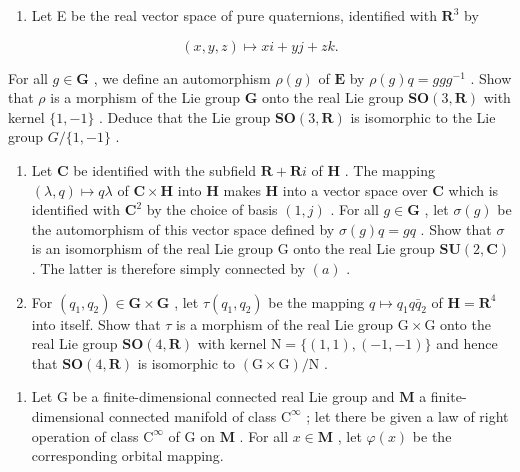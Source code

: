 \begin{enumerate}
\def\labelenumi{(\alph{enumi})}
\setcounter{enumi}{1}
\tightlist
\item
  Let E be the real vector space of pure quaternions, identified with \(\mathbf{R}^3\) by
\end{enumerate}

\[
(x, y, z) \mapsto x i + y j + z k.
\]

For all \(g \in \mathbf{G}\) , we define an automorphism \(\rho(g)\) of \(\mathbf{E}\) by \(\rho(g)q = ggg^{-1}\) . Show that \(\rho\) is a morphism of the Lie group \(\mathbf{G}\) onto the real Lie group \(\mathbf{SO}(3, \mathbf{R})\) with kernel \(\{1, -1\}\) . Deduce that the Lie group \(\mathbf{SO}(3, \mathbf{R})\) is isomorphic to the Lie group \(G / \{1, -1\}\) .

\begin{enumerate}
\def\labelenumi{(\alph{enumi})}
\setcounter{enumi}{2}
\item
  Let \(\mathbf{C}\) be identified with the subfield \(\mathbf{R} + \mathbf{R}i\) of \(\mathbf{H}\) . The mapping \((\lambda, q) \mapsto q\lambda\) of \(\mathbf{C} \times \mathbf{H}\) into \(\mathbf{H}\) makes \(\mathbf{H}\) into a vector space over \(\mathbf{C}\) which is identified with \(\mathbf{C}^2\) by the choice of basis \((1, j)\) . For all \(g \in \mathbf{G}\) , let \(\sigma(g)\) be the automorphism of this vector space defined by \(\sigma(g)q = gq\) . Show that \(\sigma\) is an isomorphism of the real Lie group G onto the real Lie group \(\mathbf{SU}(2, \mathbf{C})\) . The latter is therefore simply connected by \((a)\) .
\item
  For \((q_{1}, q_{2}) \in \mathbf{G} \times \mathbf{G}\) , let \(\tau(q_{1}, q_{2})\) be the mapping \(q \mapsto q_{1}q\bar{q}_{2}\) of \(\mathbf{H} = \mathbf{R}^{4}\) into itself. Show that \(\tau\) is a morphism of the real Lie group \(\mathrm{G} \times \mathrm{G}\) onto the real Lie group \(\mathbf{SO}(4, \mathbf{R})\) with kernel \(\mathrm{N} = \{(1, 1), (-1, -1)\}\) and hence that \(\mathbf{SO}(4, \mathbf{R})\) is isomorphic to \((\mathrm{G} \times \mathrm{G}) / \mathrm{N}\) .
\end{enumerate}

\begin{enumerate}
\def\labelenumi{\arabic{enumi}.}
\setcounter{enumi}{7}
\tightlist
\item
  Let \(\mathrm{G}\) be a finite-dimensional connected real Lie group and \(\mathbf{M}\) a finite-dimensional connected manifold of class \(\mathrm{C}^{\infty}\) ; let there be given a law of right operation of class \(\mathrm{C}^{\infty}\) of \(\mathrm{G}\) on \(\mathbf{M}\) . For all \(x \in \mathbf{M}\) , let \(\varphi(x)\) be the corresponding orbital mapping.
\end{enumerate}

